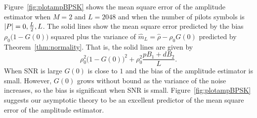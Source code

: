 \documentclass[journal]{IEEEtran}
\begin{document}

Figure~\ref{fig:plotampBPSK} %
shows the mean square error of the amplitude estimator when $M=2$ and $L=2048$ and when the number of pilots symbols is ${\left\vert P \right\vert} = 0, \tfrac{L}{2}, L$.  The solid lines show the mean square error predicted by the bias $\rho_0\big(1 - G(0)\big)$ squared plus the variance of $\hat{m}_L = \hat{\rho} - \rho_0G(0)$ predicted by Theorem~\ref{thm:normality}.  That is, the solid lines are given by
\[
\rho_0^2\big(1 - G(0)\big)^2 + \rho_0^2\frac{p B_1 + d B_2}{L}. 
\]
When SNR is large $G(0)$ is close to $1$ and the bias of the amplitude estimator is small.  However, $G(0)$ grows without bound as the variance of the noise increases, so the bias is significant when SNR is small.  Figure~\ref{fig:plotampBPSK} suggests our asymptotic theory to be an excellent predictor of the mean square error of the amplitude estimator.
\end{document}

